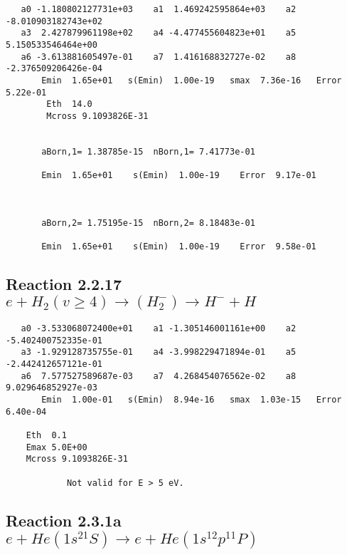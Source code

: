 \documentclass[12pt,dvipdfmx]{article}
\begin{document}
\begin{small}\begin{verbatim}
   a0 -1.180802127731e+03    a1  1.469242595864e+03    a2 -8.010903182743e+02
   a3  2.427879961198e+02    a4 -4.477455604823e+01    a5  5.150533546464e+00
   a6 -3.613881605497e-01    a7  1.416168832727e-02    a8 -2.376509206426e-04
       Emin  1.65e+01   s(Emin)  1.00e-19   smax  7.36e-16   Error  5.22e-01
        Eth  14.0
        Mcross 9.1093826E-31


       aBorn,1= 1.38785e-15  nBorn,1= 7.41773e-01

       Emin  1.65e+01    s(Emin)  1.00e-19    Error  9.17e-01



       aBorn,2= 1.75195e-15  nBorn,2= 8.18483e-01

       Emin  1.65e+01    s(Emin)  1.00e-19    Error  9.58e-01

\end{verbatim}\end{small}




\newpage
\subsection{
Reaction 2.2.17 $   e + H_2(v \geq 4) \rightarrow (H_2^-) \rightarrow H^- + H$}



\begin{small}\begin{verbatim}
   a0 -3.533068072400e+01    a1 -1.305146001161e+00    a2 -5.402400752335e-01
   a3 -1.929128735755e-01    a4 -3.998229471894e-01    a5 -2.442412657121e-01
   a6  7.577527589687e-03    a7  4.268454076562e-02    a8  9.029646852927e-03
       Emin  1.00e-01   s(Emin)  8.94e-16   smax  1.03e-15   Error  6.40e-04

    Eth  0.1
    Emax 5.0E+00
    Mcross 9.1093826E-31

            Not valid for E > 5 eV.
\end{verbatim}\end{small}




\newpage
\subsection{
Reaction 2.3.1a $e + He(1s^21S) \rightarrow e + He(1s^12p^11P)$}
\end{document}
